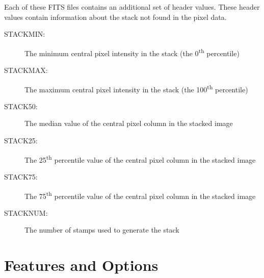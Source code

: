 \documentclass{article}
\begin{document}
\noindent Each of these FITS files contains an additional set of header values. 
These header values contain information about the stack not found in the pixel
data.
\begin{description}
	\item[STACKMIN:] The minimum central pixel intensity in the stack (the 
	0\textsuperscript{th} percentile)
	\item[STACKMAX:] The maximum central pixel intensity in the stack (the 
	100\textsuperscript{th} percentile)
	\item[STACK50:] The median value of the central pixel column in the stacked
	image
	\item[STACK25:] The 25\textsuperscript{th} percentile value of the central 
	pixel column in the	stacked image
	\item[STACK75:] The 75\textsuperscript{th} percentile value of the central 
	pixel column in the	stacked image
	\item[STACKNUM:] The number of stamps used to generate the stack
\end{description}

\section{Features and Options}
\end{document}
